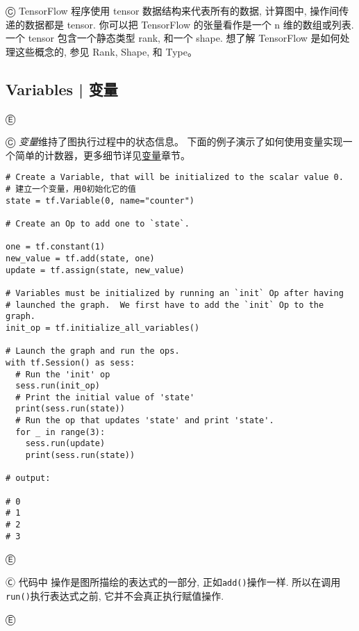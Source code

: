 Ⓒ TensorFlow 程序使用 tensor 数据结构来代表所有的数据, 计算图中, 操作间传递的数据都是 tensor. 你可以把 TensorFlow 的张量看作是一个 n 维的数组或列表. 一个 tensor 包含一个静态类型 rank, 和一个 shape. 想了解 TensorFlow 是如何处理这些概念的, 参见 Rank, Shape, 和 Type。


%
\subsection{Variables  |  变量}

Ⓔ 

Ⓒ  {\em 变量}维持了图执行过程中的状态信息。  下面的例子演示了如何使用变量实现一个简单的计数器，更多细节详见\hyperref[variables]{变量}章节。

\begin{lstlisting}
# Create a Variable, that will be initialized to the scalar value 0.
# 建立一个变量，用0初始化它的值
state = tf.Variable(0, name="counter")

# Create an Op to add one to `state`.

one = tf.constant(1)
new_value = tf.add(state, one)
update = tf.assign(state, new_value)

# Variables must be initialized by running an `init` Op after having
# launched the graph.  We first have to add the `init` Op to the graph.
init_op = tf.initialize_all_variables()

# Launch the graph and run the ops.
with tf.Session() as sess:
  # Run the 'init' op
  sess.run(init_op)
  # Print the initial value of 'state'
  print(sess.run(state))
  # Run the op that updates 'state' and print 'state'.
  for _ in range(3):
    sess.run(update)
    print(sess.run(state))

# output:

# 0
# 1
# 2
# 3
\end{lstlisting}

Ⓔ 

Ⓒ 代码中 操作是图所描绘的表达式的一部分, 正如\lstinline {add()}操作一样. 所以在调用\lstinline {run()}执行表达式之前, 它并不会真正执行赋值操作.

Ⓔ 

